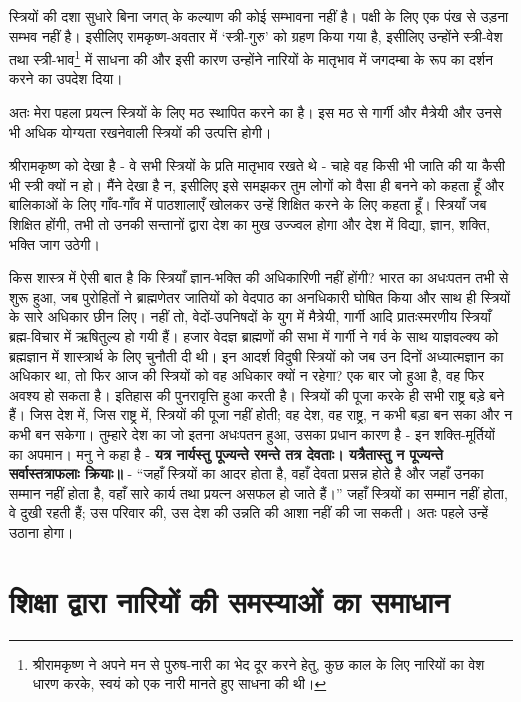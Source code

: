 स्त्रियों की दशा सुधारे बिना जगत् के कल्याण की कोई सम्भावना नहीं है। पक्षी के लिए एक पंख से उड़ना सम्भव नहीं है। इसीलिए रामकृष्ण-अवतार में ‘स्त्री-गुरु’ को ग्रहण किया गया है, इसीलिए उन्होंने स्त्री-वेश तथा स्त्री-भाव\footnote{ श्रीरामकृष्ण ने अपने मन से पुरुष-नारी का भेद दूर करने हेतु, कुछ काल के लिए नारियों का वेश धारण करके, स्वयं को एक नारी मानते हुए साधना की थी।} में साधना की और इसी कारण उन्होंने नारियों के मातृभाव में जगदम्बा के रूप का दर्शन करने का उपदेश दिया। 

अतः मेरा पहला प्रयत्न स्त्रियों के लिए मठ स्थापित करने का है। इस मठ से गार्गी और मैत्रेयी और उनसे भी अधिक योग्यता रखनेवाली स्त्रियों की उत्पत्ति होगी। 

श्रीरामकृष्ण को देखा है - वे सभी स्त्रियों के प्रति मातृभाव रखते थे - चाहे वह किसी भी जाति की या कैसी भी स्त्री क्यों न हो। मैंने देखा है न, इसीलिए इसे समझकर तुम लोगों को वैसा ही बनने को कहता हूँ और बालिकाओं के लिए गाँव-गाँव में पाठशालाएँ खोलकर उन्हें शिक्षित करने के लिए कहता हूँ। स्त्रियाँ जब शिक्षित होंगी, तभी तो उनकी सन्तानों द्वारा देश का मुख उज्ज्वल होगा और देश में विद्या, ज्ञान, शक्ति, भक्ति जाग उठेगी। 

किस शास्त्र में ऐसी बात है कि स्त्रियाँ ज्ञान-भक्ति की अधिकारिणी नहीं होंगी? भारत का अधःपतन तभी से शुरू हुआ, जब पुरोहितों ने ब्राह्मणेतर जातियों को वेदपाठ का अनधिकारी घोषित किया और साथ ही स्त्रियों के सारे अधिकार छीन लिए। नहीं तो, वेदों-उपनिषदों के युग में मैत्रेयी, गार्गी आदि प्रातःस्मरणीय स्त्रियाँ ब्रह्म-विचार में ऋषितुल्य हो गयी हैं। हजार वेदज्ञ ब्राह्मणों की सभा में गार्गी ने गर्व के साथ याज्ञवल्क्य को ब्रह्मज्ञान में शास्त्रार्थ के लिए चुनौती दी थी। इन आदर्श विदुषी स्त्रियों को जब उन दिनों अध्यात्मज्ञान का अधिकार था, तो फिर आज की स्त्रियों को वह अधिकार क्यों न रहेगा? एक बार जो हुआ है, वह फिर अवश्य हो सकता है। इतिहास की पुनरावृत्ति हुआ करती है। स्त्रियों की पूजा करके ही सभी राष्ट्र बड़े बने हैं। जिस देश में, जिस राष्ट्र में, स्त्रियों की पूजा नहीं होती; वह देश, वह राष्ट्र, न कभी बड़ा बन सका और न कभी बन सकेगा। तुम्हारे देश का जो इतना अधःपतन हुआ, उसका प्रधान कारण है - इन शक्ति-मूर्तियों का अपमान। मनु ने कहा है - \textbf{यत्र नार्यस्तु पूज्यन्ते रमन्ते तत्र देवताः। यत्रैतास्तु न पूज्यन्ते सर्वास्तत्राफलाः क्रियाः॥ } - “जहाँ स्त्रियों का आदर होता है, वहाँ देवता प्रसन्न होते है और जहाँ उनका सम्मान नहीं होता है, वहाँ सारे कार्य तथा प्रयत्न असफल हो जाते हैं।” जहाँ स्त्रियों का सम्मान नहीं होता, वे दुखी रहती हैं; उस परिवार की, उस देश की उन्नति की आशा नहीं की जा सकती। अतः पहले उन्हें उठाना होगा।


\section*{शिक्षा द्वारा नारियों की समस्याओं का समाधान}

